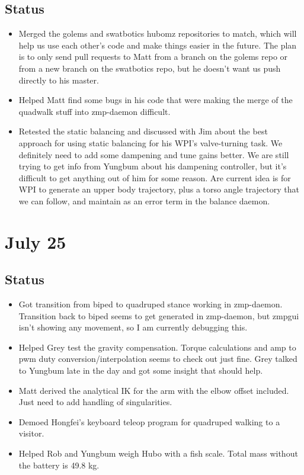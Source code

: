 \documentclass[letterpaper, 10 pt]{report}
\begin{document}
\subsection*{Status}
\begin{itemize}
\item Merged the golems and swatbotics hubomz repositories to match, which will help us use each other's code and make things easier in the future. The plan is to only send pull requests to Matt from a branch on the golems repo or from a new branch on the swatbotics repo, but he doesn't want us push directly to his master.
\item Helped Matt find some bugs in his code that were making the merge of the quadwalk stuff into zmp-daemon difficult.
\item Retested the static balancing and discussed with Jim about the best approach for using static balancing for his WPI's valve-turning task. We definitely need to add some dampening and tune gains better. We are still trying to get info from Yungbum about his dampening controller, but it's difficult to get anything out of him for some reason. Are current idea is for WPI to generate an upper body trajectory, plus a torso angle trajectory that we can follow, and maintain as an error term in the balance daemon.
\end{itemize}

\section*{July 25}
\subsection*{Status}
\begin{itemize}
\item Got transition from biped to quadruped stance working in zmp-daemon. Transition back to biped seems to get generated in zmp-daemon, but zmpgui isn't showing any movement, so I am currently debugging this.
\item Helped Grey test the gravity compensation. Torque calculations and amp to pwm duty conversion/interpolation seems to check out just fine. Grey talked to Yungbum late in the day and got some insight that should help.
\item Matt derived the analytical IK for the arm with the elbow offset included. Just need to add handling of singularities.
\item Demoed Hongfei's keyboard teleop program for quadruped walking to a visitor.
\item Helped Rob and Yungbum weigh Hubo with a fish scale. Total mass without the battery is 49.8 kg.
\end{itemize}
\end{document}
